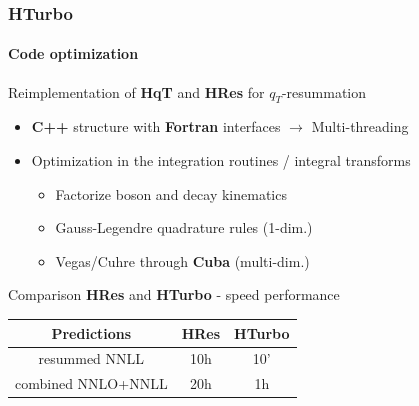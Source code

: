 \documentclass[aspectratio=43]{beamer}
\begin{document}
\begin{frame}

	\frametitle{HTurbo}
	\framesubtitle{Code optimization}
	
	Reimplementation of \textbf{HqT} and \textbf{HRes} for $q_{T}$-resummation
	\begin{itemize}
		\item \textbf{C++} structure with \textbf{Fortran} interfaces $\rightarrow$ Multi-threading
		\item Optimization in the integration routines / integral transforms 
		\begin{itemize}
			\item Factorize boson and decay kinematics
			\item Gauss-Legendre quadrature rules (1-dim.)
			\item Vegas/Cuhre through \textbf{Cuba} (multi-dim.)
		\end{itemize}
	\end{itemize}
	
	\vspace{0.5cm}
	
	Comparison \textbf{HRes} and \textbf{HTurbo} - speed performance \\
	\center
	\begin{tabular}{ | c | c | c | }
		\hline
		Predictions & \textbf{HRes} & \textbf{HTurbo} \\ 
		\hline
		resummed NNLL & 10h & 10' \\
		\hline
		combined NNLO+NNLL & 20h & 1h \\
		\hline
	\end{tabular}

	
\end{frame}
\end{document}

